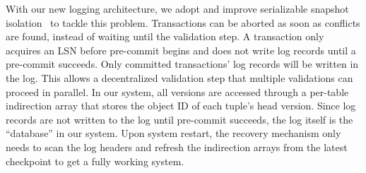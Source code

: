 \documentclass[preprint]{sig-alternate-nocprt}
\begin{document}
With our new logging architecture, we adopt and improve serializable snapshot isolation~\cite{SSI} to tackle this problem. Transactions can be aborted as soon as conflicts are found, instead of waiting until the validation step. A transaction only acquires an LSN before pre-commit begins and does not write log records until a pre-commit succeeds. Only committed transactions' log records will be written in the log. This allows a decentralized validation step that multiple validations can proceed in parallel. In our system, all versions are accessed through a per-table indirection array that stores the object ID of each tuple's head version. Since log records are not written to the log until pre-commit succeeds, the log itself is the ``database'' in our system. Upon system restart, the recovery mechanism only needs to scan the log headers and refresh the indirection arrays from the latest checkpoint to get a fully working system.




\end{document}
